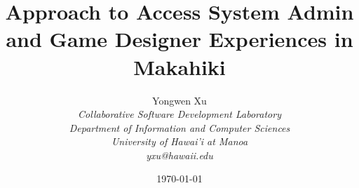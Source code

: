 \documentclass[11pt]{article}
\begin{document}
\title{Approach to Access System Admin and Game Designer Experiences in Makahiki}

\author{
	 Yongwen Xu \\
\em  Collaborative Software Development Laboratory \\
\em  Department of Information and Computer Sciences \\
\em  University of Hawai'i at Manoa\\
     yxu@hawaii.edu \\
}

\date{\today}
\maketitle

\tableofcontents

\graphicspath{{figures/}} 





\end{document}
